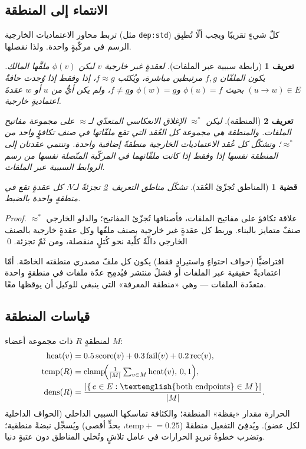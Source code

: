\documentclass[11pt]{article}
\newtheorem{definition}{تعريف}
\newtheorem{proposition}{قضية}
\newcommand{\code}[1]{\textenglish{\texttt{#1}}}
\begin{document}
\subsection{الانتماء إلى المنطقة}

تربط محاور الاعتماديات الخارجية (مثل \code{dep:std}) كلّ شيءٍ تقريبًا ويجب ألّا تُطبِق
الرسم في مركّبةٍ واحدة. ولذا نفصلها.

\begin{definition}[رابطة سببية عبر الملفات]
لعقدةٍ غير خارجية $v$ ليكن $\phi(v)$ ملفَّها المالك. يكون الملفّان $f,g$ \emph{مرتبطين
مباشرة}، ويُكتَب $f \approx g$، إذا وفقط إذا وُجدت حافةٌ $(u\!\to\!w)\in E$ بحيث
$\phi(u)=f$ و$\phi(w)=g$ و$f\neq g$، ولم يكن أيٌّ من $u$ أو $w$ عقدةَ اعتماديةٍ خارجية.
\end{definition}

\begin{definition}[المنطقة]\label{def:region}
ليكن $\approx^{*}$ الإغلاق الانعكاسي المتعدّي لـ$\approx$ على مجموعة مفاتيح الملفات.
و\emph{المنطقة} هي مجموعة كل العُقد التي تقع ملفّاتها في صنف تكافؤٍ واحد من $\approx^{*}$؛
وتشكّل كل عُقد الاعتماديات الخارجية منطقةً إضافية واحدة. وتنتمي عقدتان إلى المنطقة نفسها
إذا وفقط إذا كانت ملفّاتهما في المركّبة المتّصلة نفسها من رسم الروابط السببية عبر الملفات.
\end{definition}

\begin{proposition}[المناطق تُجزّئ العُقد]
تشكّل مناطق التعريف~\ref{def:region} تجزئةً لـ$V$: كل عقدةٍ تقع في منطقةٍ واحدة بالضبط.
\end{proposition}
\begin{proof}
$\approx^{*}$ علاقة تكافؤ على مفاتيح الملفات، فأصنافها تُجزّئ المفاتيح؛ والدلو الخارجي صنفٌ
متمايز بالبناء. وربط كل عقدةٍ غير خارجية بصنف ملفّها وكل عقدةٍ خارجية بالصنف الخارجي دالّةٌ
كلّية نحو كُتلٍ منفصلة، ومن ثَمّ تجزئة. \qed
\end{proof}

افتراضيًّا (حواف احتواءٍ واستيرادٍ فقط) يكون كل ملفّ مصدري منطقته الخاصّة. أمّا اعتماديةٌ
حقيقية عبر الملفات أو فشلٌ منتشر فيُدمِج عدّة ملفات في منطقةٍ واحدة متعدّدة الملفات --- وهي
«منطقة المعرفة» التي ينبغي للوكيل أن يوقظها معًا.

\subsection{قياسات المنطقة}

لمنطقةٍ $R$ ذات مجموعة أعضاء $M$:
\begin{align}
\mathrm{heat}(v)        &= 0.5\,\mathrm{score}(v) + 0.3\,\mathrm{fail}(v) + 0.2\,\mathrm{rec}(v), \\
\mathrm{temp}(R)        &= \mathrm{clamp}\!\Big(\tfrac{1}{|M|}\textstyle\sum_{v\in M}\mathrm{heat}(v),\,0,1\Big), \label{eq:temp}\\
\mathrm{dens}(R)        &= \frac{|\{\,e\in E : \text{\textenglish{both endpoints}} \in M\,\}|}{|M|}. \label{eq:dens}
\end{align}
الحرارة مقدار «يقظة» المنطقة؛ والكثافة تماسكها السببي الداخلي (الحواف الداخلية لكل عضو).
ويُدفِئ التفعيل منطقةً ($\mathrm{temp}\mathrel{+}=0.25$، بحدٍّ أقصى) ويُسجِّل نبضةً منطقية؛
وتضرب خطوةُ تبريدٍ الحرارات في عامل تلاشٍ وتُخلي المناطق دون عتبةٍ دنيا.
\end{document}
